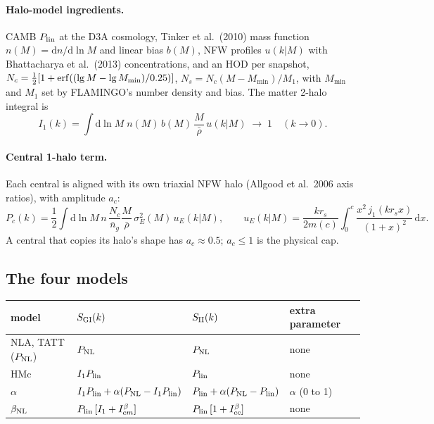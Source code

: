 \documentclass[11pt]{article}
\newcommand{\Plin}{P_{\rm lin}}
\newcommand{\PNL}{P_{\rm NL}}
\newcommand{\bNL}{\beta_{\rm NL}}
\newcommand{\Ib}[1]{I^{\beta}_{#1}}
\newcommand{\dd}{\mathrm{d}}
\begin{document}
\paragraph{Halo-model ingredients.} CAMB $\Plin$ at the D3A cosmology,
Tinker et al.\ (2010) mass function $n(M) = \dd n/\dd\ln M$ and linear bias
$b(M)$, NFW profiles $u(k|M)$ with Bhattacharya et al.\ (2013)
concentrations, and an HOD per snapshot,
$N_c = \frac12[1 + {\rm erf}((\lg M - \lg M_{\min})/0.25)]$,
$N_s = N_c(M - M_{\min})/M_1$, with $M_{\min}$ and $M_1$ set by FLAMINGO's
number density and bias. The matter 2-halo integral is
\begin{equation}
I_1(k) = \int\dd\ln M\;n(M)\,b(M)\,\frac{M}{\bar\rho}\,u(k|M)
\;\to\;1 \quad (k\to 0).
\end{equation}

\paragraph{Central 1-halo term.} Each central is aligned with its own
triaxial NFW halo (Allgood et al.\ 2006 axis ratios), with amplitude $a_c$:
\begin{equation}
P_c(k) = \frac12\int\dd\ln M\,n\,\frac{N_c}{\bar n_g}\frac{M}{\bar\rho}\,
\sigma_E^2(M)\,u_E(k|M),\qquad
u_E(k|M) = \frac{kr_s}{2m(c)}\int_0^c\frac{x^2\,j_1(kr_sx)}{(1+x)^2}\,\dd x .
\end{equation}
A central that copies its halo's shape has $a_c \approx 0.5$; $a_c \le 1$ is
the physical cap.

\subsection{The four models}

\begin{center}\footnotesize
\begin{tabular}{llll}
\toprule
model & $S_{\rm GI}(k)$ & $S_{\rm II}(k)$ & extra parameter \\
\midrule
NLA, TATT ($\PNL$) & $\PNL$ & $\PNL$ & none \\
HMc & $I_1\Plin$ & $\Plin$ & none \\
$\alpha$ & $I_1\Plin + \alpha(\PNL - I_1\Plin)$ & $\Plin + \alpha(\PNL - \Plin)$ & $\alpha$ (0 to 1) \\
$\bNL$ & $\Plin\,[I_1 + \Ib{cm}]$ & $\Plin\,[1 + \Ib{cc}]$ & none \\
\bottomrule
\end{tabular}
\end{center}
\end{document}
